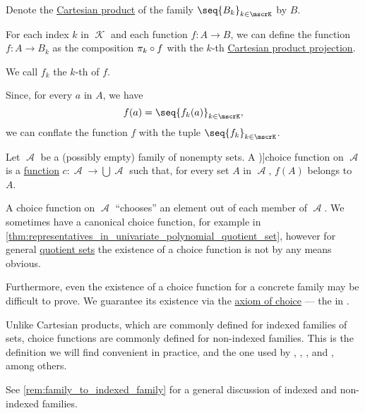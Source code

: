 \begin{definition}\label{def:projection_of_function}\mimprovised
  Denote the \hyperref[def:cartesian_product]{Cartesian product} of the family \( \seq{ B_k }_{k \in \mscrK} \) by \( B \).

  For each index \( k \) in \( \mscrK \) and each function \( f: A \to B \), we can define the function \( f: A \to B_k \) as the composition \( \pi_k \bincirc f \) with the \( k \)-th \hyperref[def:cartesian_product_projection]{Cartesian product projection}.

  We call \( f_k \) the \( k \)-th  of \( f \).
\end{definition}
\begin{comments}
  \item Since, for every \( a \) in \( A \), we have
  \begin{equation*}
    f(a) = \seq{ f_k(a) }_{k \in \mscrK},
  \end{equation*}
  we can conflate the function \( f \) with the tuple \( \seq{ f_k }_{k \in \mscrK} \).
\end{comments}

\begin{definition}\label{def:choice_function}
  Let \( \mscrA \) be a (possibly empty) family of nonempty sets. A \term[ru=функция выбора (\cite[136]{Герасимов2011Вычислимость})]{choice function} on \( \mscrA \) is a \hyperref[def:function]{function} \( c: \mscrA \to \bigcup \mscrA \) such that, for every set \( A \) in \( \mscrA \), \( f(A) \) belongs to \( A \).
\end{definition}
\begin{comments}
  \item A choice function on \( \mscrA \) \enquote{chooses} an element out of each member of \( \mscrA \). We sometimes have a canonical choice function, for example in \cref{thm:representatives_in_univariate_polynomial_quotient_set}, however for general \hyperref[def:equivalence_relation/quotient]{quotient sets} the existence of a choice function is not by any means obvious.

  \item Furthermore, even the existence of a choice function for a concrete family may be difficult to prove. We guarantee its existence via the \hyperref[def:zfc/choice]{axiom of choice} --- the  in .

  \item Unlike Cartesian products, which are commonly defined for indexed families of sets, choice functions are commonly defined for non-indexed families. This is the definition we will find convenient in practice, and the one used by
  ,
  ,
  ,
   and
  ,
  among others.

  See \cref{rem:family_to_indexed_family} for a general discussion of indexed and non-indexed families.
\end{comments}

